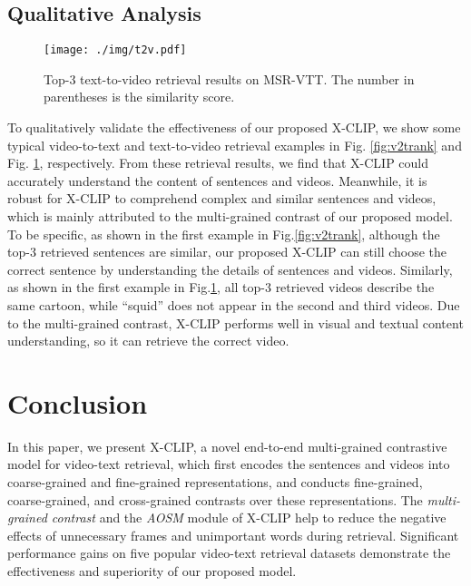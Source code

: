 \documentclass[sigconf]{acmart}
\begin{document}
\subsection{Qualitative Analysis}


\begin{figure}
\centering 
\vspace{-0.2cm}
  \texttt{[image: ./img/t2v.pdf]}
  \vspace{-0.4cm}
  \caption{ Top-3 text-to-video retrieval results on MSR-VTT. The number in parentheses is the similarity score.
  }
  \vspace{-0.4cm}
  \label{fig:t2vrank}
\end{figure}

To qualitatively validate the effectiveness of our proposed X-CLIP, we show some typical video-to-text and text-to-video retrieval examples in Fig. \ref{fig:v2trank} and Fig. \ref{fig:t2vrank}, respectively. From these retrieval results, we find that X-CLIP could accurately understand the content of sentences and videos. Meanwhile, it is robust for X-CLIP to comprehend complex and similar sentences and videos, which is mainly attributed to the multi-grained contrast of our proposed model. To be specific, as shown in the first example in Fig.\ref{fig:v2trank}, although the top-3 retrieved sentences are similar, our proposed X-CLIP can still choose the correct sentence by understanding the details of sentences and videos. Similarly, as shown in the first example in Fig.\ref{fig:t2vrank}, all top-3 retrieved videos describe the same cartoon, while ``squid'' does not appear in the second and third videos. Due to the multi-grained contrast, X-CLIP performs well in visual and textual content understanding, so it can retrieve the correct video.




\section{Conclusion}
In this paper, we present X-CLIP, a novel end-to-end multi-grained contrastive model for video-text retrieval, which first encodes the sentences and videos into coarse-grained and fine-grained representations, and conducts fine-grained, coarse-grained, and cross-grained contrasts over these representations. The \emph{multi-grained contrast} and the \emph{AOSM} module of X-CLIP help to reduce the negative effects of unnecessary frames and unimportant words during retrieval. Significant performance gains on five popular video-text retrieval datasets demonstrate the effectiveness and superiority of our proposed model.
\end{document}

